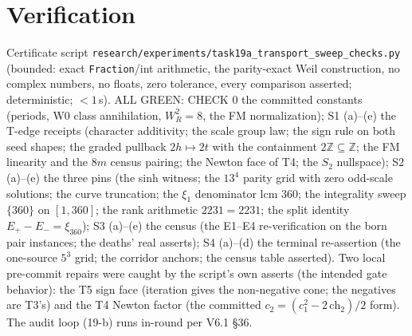 \documentclass[11pt]{article}
\begin{document}
\section{Verification}

Certificate script
\texttt{research/experiments/task19a\_transport\_sweep\_checks.py}
(bounded: exact \texttt{Fraction}/int arithmetic, the parity-exact Weil
construction, no complex numbers, no floats, zero tolerance, every comparison
asserted; deterministic; $<1$\,s). ALL GREEN: CHECK 0 the committed constants
(periods, W0 class annihilation, $W_R^2=8$, the FM normalization); S1 (a)--(e)
the T-edge receipts (character additivity; the scale group law; the sign rule
on both seed shapes; the graded pullback $2h\mapsto2t$ with the containment
$2\mathbb Z\subseteq\mathbb Z$; the FM linearity and the $8m$ census pairing;
the Newton face of T4; the $S_2$ nullspace); S2 (a)--(e) the three pins (the
sinh witness; the $13^4$ parity grid with zero odd-scale solutions; the curve
truncation; the $\xi_1$ denominator lcm $360$; the integrality sweep
$\{360\}$ on $[1,360]$; the rank arithmetic $2231=2231$; the split identity
$E_+-E_-=\xi_{360}$); S3 (a)--(e) the census (the E1--E4 re-verification on
the born pair instances; the deaths' real asserts); S4 (a)--(d) the terminal
re-assertion (the one-source $5^3$ grid; the corridor anchors; the census
table asserted). Two local pre-commit repairs were caught by the script's own
asserts (the intended gate behavior): the T5 sign face (iteration gives the
non-negative cone; the negatives are T3's) and the T4 Newton factor (the
committed $c_2=(c_1^2-2\,\mathrm{ch}_2)/2$ form). The audit loop (19-b) runs
in-round per V6.1 \S36.
\end{document}
